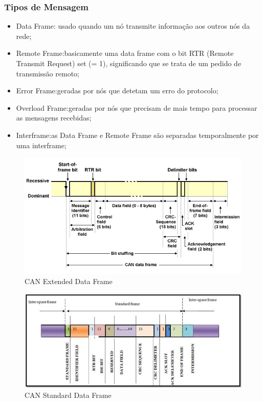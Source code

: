 \documentclass[10pt,a4paper]{paper}
\begin{document}
\subsubsection*{Tipos de Mensagem}

\begin{itemize}
	\item Data Frame: usado quando um	nó transmite informação aos outros nós da rede;
	\item Remote Frame:basicamente uma data	frame	com	o	bit RTR	(Remote	Transmit Request) set	(=	1), significando que	se trata de	um	pedido de	transmissão remoto;
	\item Error Frame:geradas por nós que detetam um erro do protocolo;
	\item Overload Frame:geradas por nós que precisam de mais tempo para processar as mensagens recebidas;
	\item Interframe:as Data Frame e Remote Frame são separadas temporalmente por uma interframe;
\end{itemize}

	 	\begin{figure}[ht]
		\includegraphics[scale=0.5] {fig15.png}
		\centering
		\caption {CAN Extended Data Frame}
		\label{fig:figura11}
	\end{figure}
	
	\begin{figure}[ht]
		\includegraphics[scale=0.5] {fig16.JPG}
		\centering
		\caption {CAN Standard Data Frame}
		\label{fig:figura11}
	\end{figure}
\end{document}
